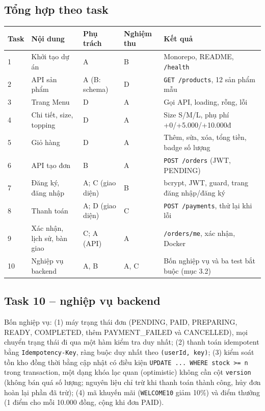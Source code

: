 \documentclass[a4paper]{article}
\begin{document}
\subsection{Tổng hợp theo task}
\begin{center}
\small\everymath{}\raggedright
\begin{tabular}{@{}p{0.8cm}p{3.0cm}p{3.0cm}p{1.7cm}p{4.5cm}@{}}
\toprule
\textbf{Task} & \textbf{Nội dung} & \textbf{Phụ trách} & \textbf{Nghiệm thu} & \textbf{Kết quả} \\ \midrule
1 & Khởi tạo dự án & A & B & Monorepo, README, \texttt{/health} \\
2 & API sản phẩm & A (B: schema) & D & \texttt{GET /products}, 12 sản phẩm mẫu \\
3 & Trang Menu & D & A & Gọi API, loading, rỗng, lỗi \\
4 & Chi tiết, size, topping & D & A & Size S/M/L, phụ phí +0/+5.000/+10.000đ \\
5 & Giỏ hàng & D & A & Thêm, sửa, xóa, tổng tiền, badge số lượng \\
6 & API tạo đơn & B & A & \texttt{POST /orders} (JWT, PENDING) \\
7 & Đăng ký, đăng nhập & A; C (giao diện) & B & bcrypt, JWT, guard, trang đăng nhập/đăng ký \\
8 & Thanh toán & A; D (giao diện) & C & \texttt{POST /payments}, thử lại khi lỗi \\
9 & Xác nhận, lịch sử, bàn giao & C; A (API) & A & \texttt{/orders/me}, xác nhận, Docker \\
10 & Nghiệp vụ backend & A, B & A, C & Bốn nghiệp vụ và ba test bắt buộc (mục 3.2) \\
\bottomrule
\end{tabular}
\end{center}

\subsection{Task 10 -- nghiệp vụ backend}
Bốn nghiệp vụ: (1) máy trạng thái đơn (PENDING, PAID, PREPARING, READY, COMPLETED, thêm PAYMENT\_FAILED và CANCELLED), mọi chuyển trạng thái đi qua một hàm kiểm tra duy nhất; (2) thanh toán idempotent bằng \texttt{Idempotency-Key}, ràng buộc duy nhất theo \texttt{(userId, key)}; (3) kiểm soát tồn kho đồng thời bằng cập nhật có điều kiện \texttt{UPDATE ... WHERE stock >= n} trong transaction, một dạng khóa lạc quan (optimistic) không cần cột \texttt{version} (không bán quá số lượng; nguyên liệu chỉ trừ khi thanh toán thành công, hủy đơn hoàn lại phần đã trừ); (4) mã khuyến mãi (\texttt{WELCOME10} giảm 10\%) và điểm thưởng (1 điểm cho mỗi 10.000 đồng, cộng khi đơn PAID).
\end{document}
